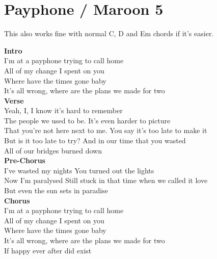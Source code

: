 \section{Payphone / Maroon 5}\label{sec:payphone}

\CaddNine
\DsusFour
\EminorSeven
\Gmajor

This also works fine with normal C, D and Em chords if it's easier.

\textbf{Intro} \\                      
I'm at a payphone trying to call home          \\          
All of my change I spent on you\\
Where have the times gone baby\\
It's all wrong, where are the plans we made for two\\
\textbf{Verse}\\
Yeah, I, I know it's hard to remember\\
The people we used to be. It's even harder to picture\\
That you're not here next to me. You say it's too late to make it\\
But is it too late to try? And in our time that you wasted\\
All of our bridges burned down\\
\textbf{Pre-Chorus}\\
I've wasted my nights You turned out the lights\\
Now I'm paralysed Still stuck in that time when we called it love\\
But even the sun sets in paradise\\
\textbf{Chorus}\\
I'm at a payphone trying to call home     \\               
All of my change I spent on you\\
Where have the times gone baby\\
It's all wrong, where are the plans we made for two\\
If happy ever after did exist\\
